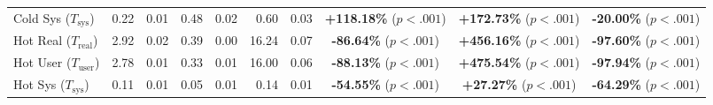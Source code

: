 \begin{table}[htbp]
{\begin{tabular}{l r@{\,$\pm$\,}l r@{\,$\pm$\,}l r@{\,$\pm$\,}l c c c}
Cold Sys ($T_\mathrm{sys}$) & 0.22 & 0.01 & 0.48 & 0.02 & 0.60 & 0.03 & \textbf{+118.18\%} ($p<.001$) & \textbf{+172.73\%} ($p<.001$) & \textbf{-20.00\%} ($p<.001$) \\
Hot Real ($T_\mathrm{real}$) & 2.92 & 0.02 & 0.39 & 0.00 & 16.24 & 0.07 & \textbf{-86.64\%} ($p<.001$) & \textbf{+456.16\%} ($p<.001$) & \textbf{-97.60\%} ($p<.001$) \\
Hot User ($T_\mathrm{user}$) & 2.78 & 0.01 & 0.33 & 0.01 & 16.00 & 0.06 & \textbf{-88.13\%} ($p<.001$) & \textbf{+475.54\%} ($p<.001$) & \textbf{-97.94\%} ($p<.001$) \\
Hot Sys ($T_\mathrm{sys}$) & 0.11 & 0.01 & 0.05 & 0.01 & 0.14 & 0.01 & \textbf{-54.55\%} ($p<.001$) & \textbf{+27.27\%} ($p<.001$) & \textbf{-64.29\%} ($p<.001$) \\
\bottomrule
\end{tabular}%
}
\end{table}

